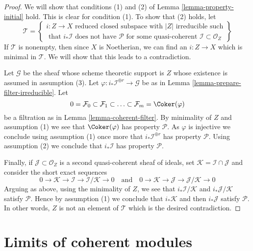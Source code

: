 \begin{proof}
We will show that conditions (1) and (2) of
Lemma \ref{lemma-property-initial} hold. This is clear for condition (1).
To show that (2) holds, let
$$
\mathcal{T} =
\left\{
\begin{matrix}
i : Z \to X \text{ reduced closed subspace with }|Z|\text{ irreducible such}\\
\text{ that }i_*\mathcal{I}\text{ does not have }\mathcal{P}
\text{ for some quasi-coherent }\mathcal{I} \subset \mathcal{O}_Z
\end{matrix}
\right\}
$$
If $\mathcal{T}$ is nonempty, then since $X$ is Noetherian, we can
find an $i : Z \to X$ which is minimal in $\mathcal{T}$. We will show
that this leads to a contradiction.

\medskip\noindent
Let $\mathcal{G}$ be the sheaf whose scheme theoretic support is $Z$ whose
existence is assumed in assumption (3). Let
$\varphi : i_*\mathcal{I}^{\oplus r} \to \mathcal{G}$ be as in
Lemma \ref{lemma-prepare-filter-irreducible}. Let
$$
0 = \mathcal{F}_0 \subset \mathcal{F}_1 \subset
\ldots \subset \mathcal{F}_m = \Coker(\varphi)
$$
be a filtration as in Lemma \ref{lemma-coherent-filter}. By minimality
of $Z$ and assumption (1) we see that $\Coker(\varphi)$ has
property $\mathcal{P}$. As $\varphi$ is injective we conclude using
assumption (1) once more that $i_*\mathcal{I}^{\oplus r}$ has property
$\mathcal{P}$. Using assumption (2) we conclude that $i_*\mathcal{I}$
has property $\mathcal{P}$.

\medskip\noindent
Finally, if $\mathcal{J} \subset \mathcal{O}_Z$ is a second quasi-coherent
sheaf of ideals, set $\mathcal{K} = \mathcal{I} \cap \mathcal{J}$
and consider the short exact sequences
$$
0 \to \mathcal{K} \to \mathcal{I} \to \mathcal{I}/\mathcal{K} \to 0
\quad
\text{and}
\quad
0 \to \mathcal{K} \to \mathcal{J} \to \mathcal{J}/\mathcal{K} \to 0
$$
Arguing as above, using the minimality of $Z$, we see that
$i_*\mathcal{I}/\mathcal{K}$ and $i_*\mathcal{J}/\mathcal{K}$
satisfy $\mathcal{P}$. Hence by assumption (1) we conclude that
$i_*\mathcal{K}$ and then $i_*\mathcal{J}$ satisfy $\mathcal{P}$.
In other words, $Z$ is not an element of $\mathcal{T}$ which is
the desired contradiction.
\end{proof}






\section{Limits of coherent modules}
\label{section-limits}

